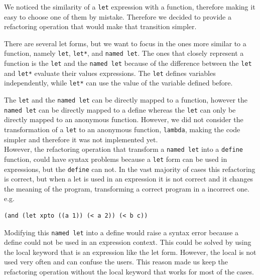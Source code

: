 We noticed the similarity of a {\tt let} expression with a function, therefore making
it easy to choose one of them by mistake.
Therefore we decided to provide a refactoring operation that would make that transition simpler.

There are several let forms, but we want to focus in the ones more similar to
a function, namely {\tt let}, {\tt let*}, and {\tt named let}.
The ones that closely represent a function is the  {\tt let} and the {\tt named let}
because of the difference between the {\tt let} and {\tt let*} evaluate their
values expressions.
The {\tt let} defines variables independently, while {\tt let*} can use the value of the variable defined before.

The {\tt let} and the {\tt named let} can be directly mapped to a function, however the {\tt named let}
 can be directly mapped to a define whereas the {\tt let} can only be directly mapped
to an anonymous function.
However, we did not consider the transformation of a {\tt let} to an anonymous function, {\tt lambda},
making the code simpler and therefore it was not implemented yet.\\


However, the refactoring operation that transform a {\tt named let} into a {\tt define} function,
 could have syntax problems because a {\tt let} form can be used in expressions, but the {\tt define} can not.
In the vast majority of cases this refactoring is correct, but when a let is used in an expression
it is not correct and it changes the meaning of the program, transforming a correct
program in a incorrect one.
e.g.
\begin{lstlisting}[basicstyle=\ttfamily, caption="Let in an expression"]
(and (let xpto ((a 1)) (< a 2)) (< b c))
\end{lstlisting}
Modifying this {\tt named let} into a define would raise a syntax error because a
define could not be used in an expression context.
This could be solved by using the local keyword that is an expression like
the let form.
However, the local is not used very often and can confuse the users.
This reason made us keep the refactoring operation without the local keyword that works for
most of the cases.




